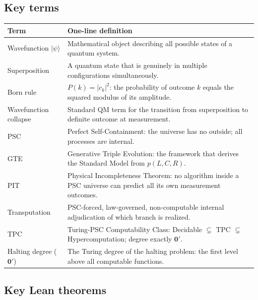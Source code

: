 \documentclass[11pt,a4paper]{article}
\begin{document}
\subsection{Key terms}

\begin{center}
\begin{tabular}{p{3.5cm}p{8.5cm}}
\toprule
\textbf{Term} & \textbf{One-line definition} \\
\midrule
Wavefunction $|\psi\rangle$ & Mathematical object describing all possible states of a quantum system. \\[4pt]
Superposition & A quantum state that is genuinely in multiple configurations simultaneously. \\[4pt]
Born rule & $P(k) = |c_k|^2$: the probability of outcome $k$ equals the squared modulus of its amplitude. \\[4pt]
Wavefunction collapse & Standard QM term for the transition from superposition to definite outcome at measurement. \\[4pt]
PSC & Perfect Self-Containment: the universe has no outside; all processes are internal. \\[4pt]
GTE & Generative Triple Evolution: the framework that derives the Standard Model from $p(L,C,R)$. \\[4pt]
PIT & Physical Incompleteness Theorem: no algorithm inside a PSC universe can predict all its own measurement outcomes. \\[4pt]
Transputation & PSC-forced, law-governed, non-computable internal adjudication of which branch is realized. \\[4pt]
TPC & Turing-PSC Computability Class: Decidable $\subsetneq$ TPC $\subsetneq$ Hypercomputation; degree exactly $\mathbf{0}'$. \\[4pt]
Halting degree ($\mathbf{0}'$) & The Turing degree of the halting problem: the first level above all computable functions. \\
\bottomrule
\end{tabular}
\end{center}

\subsection{Key Lean theorems}
\end{document}
